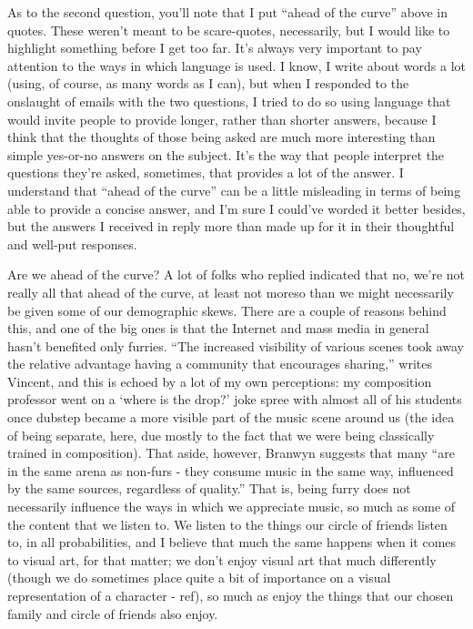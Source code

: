 As to the second question, you'll note that I put ``ahead of the curve'' above in quotes. These weren't meant to be scare-quotes, necessarily, but I would like to highlight something before I get too far. It's always very important to pay attention to the ways in which language is used. I know, I write about words a lot (using, of course, as many words as I can), but when I responded to the onslaught of emails with the two questions, I tried to do so using language that would invite people to provide longer, rather than shorter answers, because I think that the thoughts of those being asked are much more interesting than simple yes-or-no answers on the subject. It's the way that people interpret the questions they're asked, sometimes, that provides a lot of the answer. I understand that ``ahead of the curve'' can be a little misleading in terms of being able to provide a concise answer, and I'm sure I could've worded it better besides, but the answers I received in reply more than made up for it in their thoughtful and well-put responses.

Are we ahead of the curve? A lot of folks who replied indicated that no, we're not really all that ahead of the curve, at least not moreso than we might necessarily be given some of our demographic skews. There are a couple of reasons behind this, and one of the big ones is that the Internet and mass media in general hasn't benefited only furries. ``The increased visibility of various scenes took away the relative advantage having a community that encourages sharing,'' writes Vincent, and this is echoed by a lot of my own perceptions: my composition professor went on a `where is the drop?' joke spree with almost all of his students once dubstep became a more visible part of the music scene around us (the idea of being separate, here, due mostly to the fact that we were being classically trained in composition). That aside, however, Branwyn suggests that many ``are in the same arena as non-furs - they consume music in the same way, influenced by the same sources, regardless of quality.'' That is, being furry does not necessarily influence the ways in which we appreciate music, so much as some of the content that we listen to. We listen to the things our circle of friends listen to, in all probabilities, and I believe that much the same happens when it comes to visual art, for that matter; we don't enjoy visual art that much differently (though we do sometimes place quite a bit of importance on a visual representation of a character - ref), so much as enjoy the things that our chosen family and circle of friends also enjoy.

